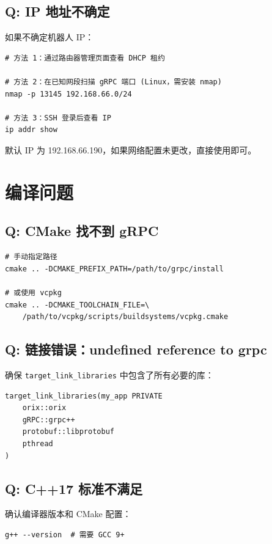 \documentclass[a4paper,11pt,openany]{book}
\begin{document}
\subsection{Q: IP 地址不确定}

如果不确定机器人 IP：

\begin{lstlisting}[style=bash]
# 方法 1：通过路由器管理页面查看 DHCP 租约

# 方法 2：在已知网段扫描 gRPC 端口 (Linux，需安装 nmap)
nmap -p 13145 192.168.66.0/24

# 方法 3：SSH 登录后查看 IP
ip addr show
\end{lstlisting}

默认 IP 为 192.168.66.190，如果网络配置未更改，直接使用即可。

\section{编译问题}

\subsection{Q: CMake 找不到 gRPC}

\begin{lstlisting}[style=bash]
# 手动指定路径
cmake .. -DCMAKE_PREFIX_PATH=/path/to/grpc/install

# 或使用 vcpkg
cmake .. -DCMAKE_TOOLCHAIN_FILE=\
    /path/to/vcpkg/scripts/buildsystems/vcpkg.cmake
\end{lstlisting}

\subsection{Q: 链接错误：undefined reference to grpc}

确保 \texttt{target\_link\_libraries} 中包含了所有必要的库：

\begin{lstlisting}[style=cmake]
target_link_libraries(my_app PRIVATE
    orix::orix
    gRPC::grpc++
    protobuf::libprotobuf
    pthread
)
\end{lstlisting}

\subsection{Q: C++17 标准不满足}

确认编译器版本和 CMake 配置：

\begin{lstlisting}[style=bash]
g++ --version  # 需要 GCC 9+
\end{lstlisting}
\end{document}
